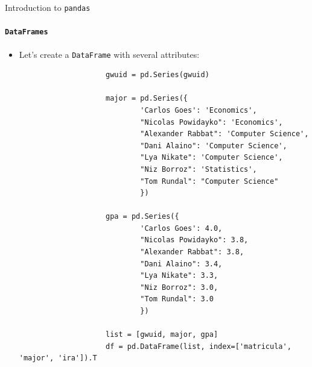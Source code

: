 \documentclass[notes,11pt, aspectratio=169, xcolor=table]{beamer}
\begin{document}
        \begin{frame}[fragile=singleslide]{Introduction to \texttt{pandas}}
        \framesubtitle{\texttt{DataFrames}}
            
             \begin{itemize}
    
                \item Let’s create a \texttt{DataFrame} with several attributes:

                    \begin{verbatim}
                    gwuid = pd.Series(gwuid)
                    
                    major = pd.Series({
                            'Carlos Goes': 'Economics',
                            "Nicolas Powidayko": 'Economics',
                            "Alexander Rabbat": 'Computer Science',
                            "Dani Alaino": 'Computer Science',
                            "Lya Nikate": 'Computer Science',
                            "Niz Borroz": 'Statistics',
                            "Tom Rundal": "Computer Science"
                            })

                    gpa = pd.Series({
                            'Carlos Goes': 4.0,
                            "Nicolas Powidayko": 3.8,
                            "Alexander Rabbat": 3.8,
                            "Dani Alaino": 3.4,
                            "Lya Nikate": 3.3,
                            "Niz Borroz": 3.0,
                            "Tom Rundal": 3.0
                            })

                    list = [gwuid, major, gpa]
                    df = pd.DataFrame(list, index=['matricula', 'major', 'ira']).T
                    \end{verbatim}
        
            \end{itemize}             

        \end{frame}    
\end{document}
